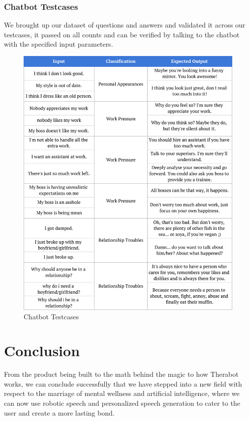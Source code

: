 \documentclass[conference,compsoc]{IEEEtran}
\begin{document}
\subsubsection{Chatbot Testcases}

\noindent
We brought up our dataset of questions and answers and validated it across our testcases, it passed on all counts and can be verified by talking to the chatbot with the specified input parameters.

\begin{figure}[H]
    \centering
    \includegraphics[width=\linewidth]{images/chatbot-testcases.jpg}
    \caption{Chatbot Testcases}
\end{figure}


\section{Conclusion}

From the product being built to the math behind the magic to how Therabot works, we can conclude successfully that we have stepped into a new field with respect to the marriage of mental wellness and artificial intelligence, where we can now use robotic speech and personalized speech generation to cater to the user and create a more lasting bond.
\end{document}
